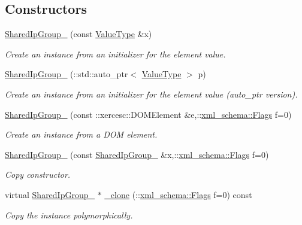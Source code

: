 \subsection*{Constructors}
\begin{DoxyCompactItemize}
\item 
\hyperlink{classopenstack_1_1xml_1_1SharedIpGroup___a2feb1638ad7939a2cc5d1034711982f1}{SharedIpGroup\_\-} (const \hyperlink{classopenstack_1_1xml_1_1SharedIpGroup}{ValueType} \&x)
\begin{DoxyCompactList}\small\item\em Create an instance from an initializer for the element value. \item\end{DoxyCompactList}\item 
\hyperlink{classopenstack_1_1xml_1_1SharedIpGroup___adbcb3dcb34ce55dd4b6f5e98c23a2151}{SharedIpGroup\_\-} (::std::auto\_\-ptr$<$ \hyperlink{classopenstack_1_1xml_1_1SharedIpGroup}{ValueType} $>$ p)
\begin{DoxyCompactList}\small\item\em Create an instance from an initializer for the element value (auto\_\-ptr version). \item\end{DoxyCompactList}\item 
\hyperlink{classopenstack_1_1xml_1_1SharedIpGroup___a88bcdeb50c5ae475d09b166a39e13cbe}{SharedIpGroup\_\-} (const ::xercesc::DOMElement \&e,::\hyperlink{namespacexml__schema_affb4c227cbd9aa7453dd1dc5a1401943}{xml\_\-schema::Flags} f=0)
\begin{DoxyCompactList}\small\item\em Create an instance from a DOM element. \item\end{DoxyCompactList}\item 
\hyperlink{classopenstack_1_1xml_1_1SharedIpGroup___ac908d9c2d3dfa49e83e3ed2ab60476fc}{SharedIpGroup\_\-} (const \hyperlink{classopenstack_1_1xml_1_1SharedIpGroup__}{SharedIpGroup\_\-} \&x,::\hyperlink{namespacexml__schema_affb4c227cbd9aa7453dd1dc5a1401943}{xml\_\-schema::Flags} f=0)
\begin{DoxyCompactList}\small\item\em Copy constructor. \item\end{DoxyCompactList}\item 
virtual \hyperlink{classopenstack_1_1xml_1_1SharedIpGroup__}{SharedIpGroup\_\-} $\ast$ \hyperlink{classopenstack_1_1xml_1_1SharedIpGroup___a397f2f011094b505fc80f078f689b2b4}{\_\-clone} (::\hyperlink{namespacexml__schema_affb4c227cbd9aa7453dd1dc5a1401943}{xml\_\-schema::Flags} f=0) const 
\begin{DoxyCompactList}\small\item\em Copy the instance polymorphically. \item\end{DoxyCompactList}\end{DoxyCompactItemize}

